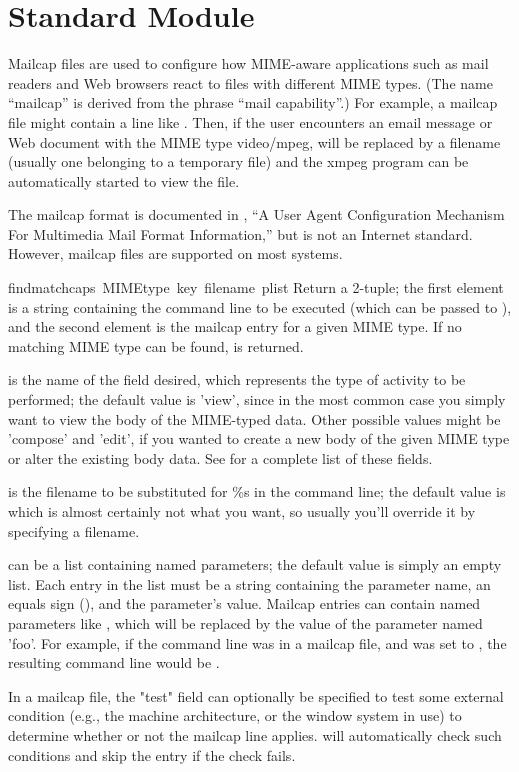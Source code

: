 \section{Standard Module }
\label{module-mailcap}
\renewcommand{\indexsubitem}{(in module mailcap)}

Mailcap files are used to configure how MIME-aware applications such
as mail readers and Web browsers react to files with different MIME
types. (The name ``mailcap'' is derived from the phrase ``mail
capability''.)  For example, a mailcap file might contain a line like
.  Then, if the user encounters an email
message or Web document with the MIME type video/mpeg,  will be
replaced by a filename (usually one belonging to a temporary file) and
the xmpeg program can be automatically started to view the file.

The mailcap format is documented in , ``A User Agent
Configuration Mechanism For Multimedia Mail Format Information,'' but
is not an Internet standard.  However, mailcap files are supported on
most \UNIX{} systems.

\begin{funcdesc}{findmatch}{caps\, MIMEtype\, key\, filename\, plist}
Return a 2-tuple; the first element is a string containing the command
line to be executed
(which can be passed to ), and the second element is
the mailcap entry for a given MIME type.  If no matching MIME
type can be found,  is returned.

 is the name of the field desired, which represents the type
of activity to be performed; the default value is 'view', since in the 
most common case you simply want to view the body of the MIME-typed
data.  Other possible values might be 'compose' and 'edit', if you
wanted to create a new body of the given MIME type or alter the
existing body data.  See  for a complete list of these
fields.

 is the filename to be substituted for \%s in the
command line; the default value is
 which is almost certainly not what you want, so
usually you'll override it by specifying a filename.

 can be a list containing named parameters; the default
value is simply an empty list.  Each entry in the list must be a
string containing the parameter name, an equals sign (\code{=}), and the
parameter's value.  Mailcap entries can contain 
named parameters like , which will be replaced by the
value of the parameter named 'foo'.  For example, if the command line
was in a mailcap file, and  was set to \code{['id=1',
'number=2', 'total=3']}, the resulting command line would be 
.  

In a mailcap file, the "test" field can optionally be specified to
test some external condition (e.g., the machine architecture, or the
window system in use) to determine whether or not the mailcap line
applies.   will automatically check such conditions
and skip the entry if the check fails.
\end{funcdesc}

